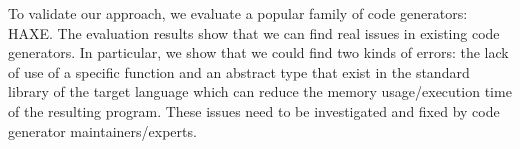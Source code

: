 To validate our approach, we evaluate a popular family of code generators: HAXE. 
The evaluation results show that we can find real issues in existing code generators.  
In particular, we show that we could find two kinds of errors: the lack of use of a specific function and an abstract type that exist in the standard library of the target language which can reduce the memory usage/execution time of the resulting program. These issues need to be investigated and fixed by code generator maintainers/experts.









\iffalse
\begin{table}[h]
	\centering	
\end{table}
